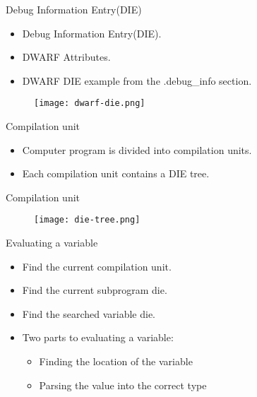 
\begin{frame}{Debug Information Entry(DIE)}
	\begin{itemize}
	    \item Debug Information Entry(DIE).
	    \item DWARF Attributes.
	    \item DWARF DIE example from the .debug\_info section.
	\end{itemize}
	\begin{figure}
		\texttt{[image: dwarf-die.png]}
	\end{figure}
\end{frame}


\begin{frame}{Compilation unit}
	\begin{itemize}
		\item Computer program is divided into compilation units.
		\item Each compilation unit contains a DIE tree.
	\end{itemize}
\end{frame}


\begin{frame}{Compilation unit}
	\begin{figure}
		\texttt{[image: die-tree.png]}
	\end{figure}
\end{frame}


\begin{frame}{Evaluating a variable}
	\begin{itemize}
		\item Find the current compilation unit.
		\item Find the current subprogram die.
		\item Find the searched variable die. 
		\item Two parts to evaluating a variable:
			\begin{itemize}
				\item Finding the location of the variable
				\item Parsing the value into the correct type
			\end{itemize}
	\end{itemize}
\end{frame}


